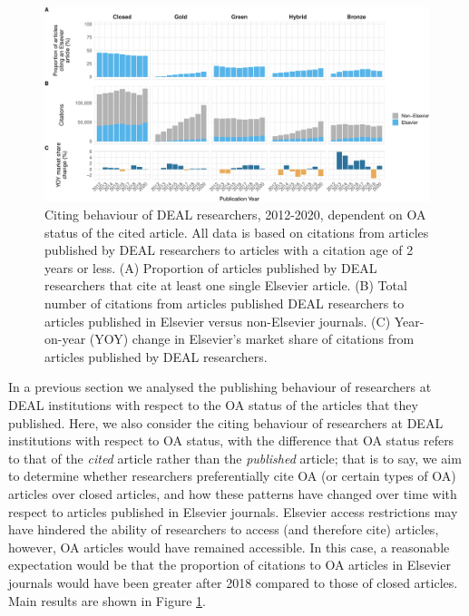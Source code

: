 \documentclass[
]{article}
\begin{document}
\begin{figure}
\centering
\includegraphics{analysis_files/figure-latex/references-publisher-year-oa-1.pdf}
\caption{\label{fig:references-publisher-year-oa}Citing behaviour of DEAL researchers, 2012-2020, dependent on OA status of the cited article. All data is based on citations from articles published by DEAL researchers to articles with a citation age of 2 years or less. (A) Proportion of articles published by DEAL researchers that cite at least one single Elsevier article. (B) Total number of citations from articles published DEAL researchers to articles published in Elsevier versus non-Elsevier journals. (C) Year-on-year (YOY) change in Elsevier's market share of citations from articles published by DEAL researchers.}
\end{figure}

In a previous section we analysed the publishing behaviour of researchers at DEAL institutions with respect to the OA status of the articles that they published. Here, we also consider the citing behaviour of researchers at DEAL institutions with respect to OA status, with the difference that OA status refers to that of the \emph{cited} article rather than the \emph{published} article; that is to say, we aim to determine whether researchers preferentially cite OA (or certain types of OA) articles over closed articles, and how these patterns have changed over time with respect to articles published in Elsevier journals. Elsevier access restrictions may have hindered the ability of researchers to access (and therefore cite) articles, however, OA articles would have remained accessible. In this case, a reasonable expectation would be that the proportion of citations to OA articles in Elsevier journals would have been greater after 2018 compared to those of closed articles. Main results are shown in Figure \ref{fig:references-publisher-year-oa}.
\end{document}
